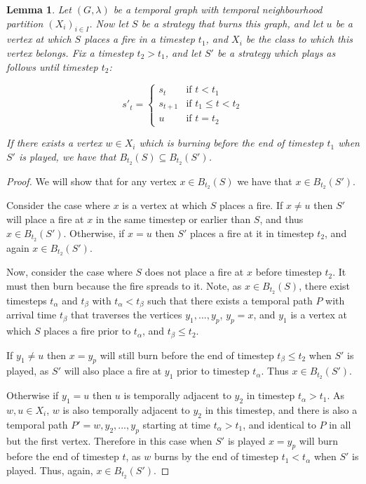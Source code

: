 \documentclass[preprint,12pt]{elsarticle}
\newtheorem{lemma}{Lemma}
\begin{document}
\begin{lemma}
    \label{lem:alreadyburn1}
    Let $(G, \lambda)$ be a temporal graph with temporal neighbourhood partition $(X_i)_{i\in I}$. Now let $S$ be a strategy that burns this graph, and let $u$ be a vertex at which $S$ places a fire in a timestep $t_1$, and $X_i$ be the class to which this vertex belongs. Fix a timestep $t_2 > t_1$, and let $S'$ be a strategy which plays as follows until timestep $t_2$:

    \[
    s'_t=\begin{cases}
        s_t&\text{if }t<t_1\\
        s_{t+1}&\text{if }t_1\leq t < t_2\\
        u&\text{if }t=t_2
    \end{cases}
    \]

    If there exists a vertex $w \in X_i$ which is burning before the end of timestep $t_1$ when $S'$ is played, we have that $B_{t_2}(S) \subseteq B_{t_2}(S')$.
\end{lemma}
\begin{proof}
    We will show that for any vertex $x \in B_{t_2}(S)$ we have that $x \in B_{t_2}(S')$.

    Consider the case where $x$ is a vertex at which $S$ places a fire. If $x \neq u$ then $S'$ will place a fire at $x$ in the same timestep or earlier than $S$, and thus $x \in B_{t_2}(S')$. Otherwise, if $x = u$ then $S'$ places a fire at it in timestep $t_2$, and again $x \in B_{t_2}(S')$.

    Now, consider the case where $S$ does not place a fire at $x$ before timestep $t_2$. It must then burn because the fire spreads to it. Note, as $x \in B_{t_2}(S)$, there exist timesteps $t_\alpha$ and $t_\beta$ with $t_\alpha < t_\beta$ such that there exists a temporal path $P$ with arrival time $t_\beta$ that traverses the vertices $y_1, ..., y_p$, $y_p = x$, and $y_1$ is a vertex at which $S$ places a fire prior to $t_\alpha$, and $t_\beta \leq t_2$.

    If $y_1 \neq u$ then $x = y_p$ will still burn before the end of timestep $t_\beta \leq t_2$ when $S'$ is played, as $S'$ will also place a fire at $y_1$ prior to timestep $t_\alpha$. Thus $x \in B_{t_2}(S')$.

    Otherwise if $y_1 = u$ then $u$ is temporally adjacent to $y_2$ in timestep $t_\alpha > t_1$. As $w, u \in X_i$, $w$ is also temporally adjacent to $y_2$ in this timestep, and there is also a temporal path $P' = w, y_2, ..., y_p$ starting at time $t_\alpha > t_1$, and identical to $P$ in all but the first vertex. Therefore in this case when $S'$ is played $x = y_p$ will burn before the end of timestep $t$, as $w$ burns by the end of timestep $t_1 < t_\alpha$ when $S'$ is played. Thus, again, $x \in B_{t_2}(S')$.
\end{proof}
\end{document}
